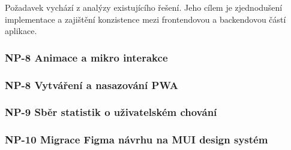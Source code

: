 Požadavek vychází z analýzy existujícího řešení. Jeho cílem je zjednodušení implementace a zajištění konzistence mezi frontendovou a backendovou částí aplikace.

\subsubsection{NP-8 Animace a mikro interakce}


\subsubsection{NP-8 Vytváření a nasazování PWA}


\subsubsection{NP-9 Sběr statistik o uživatelském chování}


\subsubsection{NP-10 Migrace Figma návrhu na MUI design systém}

